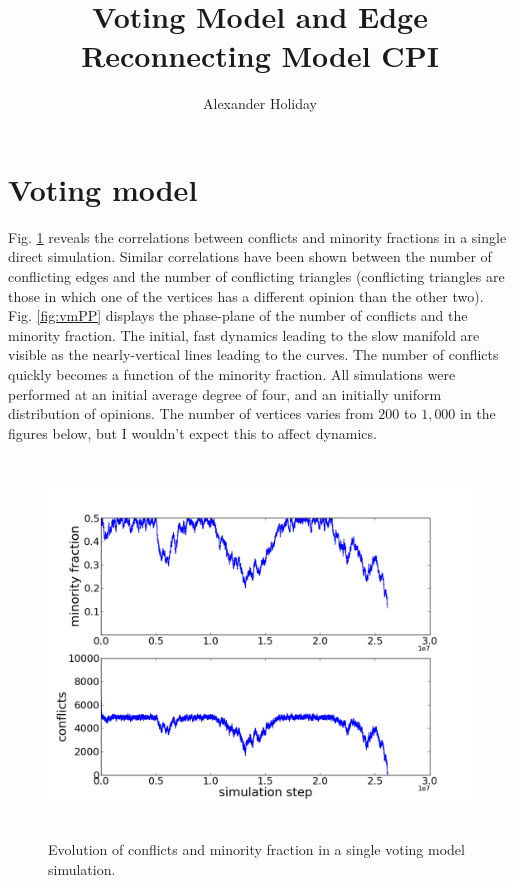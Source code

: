 \documentclass[11pt]{article}
\begin{document}
\title{\vspace{-5mm}Voting Model and Edge Reconnecting Model CPI}
\author{Alexander Holiday}
\maketitle
\section*{Voting model}

Fig. \ref{fig:vmDynamics} reveals the correlations between conflicts and minority fractions in a single direct simulation. Similar correlations have been shown between the number of conflicting edges and the number of conflicting triangles (conflicting triangles are those in which one of the vertices has a different opinion than the other two). Fig. \ref{fig:vmPP} displays the phase-plane of the number of conflicts and the minority fraction. The initial, fast dynamics leading to the slow manifold are visible as the nearly-vertical lines leading to the curves. The number of conflicts quickly becomes a function of the minority fraction. All simulations were performed at an initial average degree of four, and an initially uniform distribution of opinions. The number of vertices varies from $200$ to $1,000$ in the figures below, but I wouldn't expect this to affect dynamics.

\begin{figure}[h!]
  \centering
  \includegraphics[height=100mm]{vmDynamics}
  \caption{Evolution of conflicts and minority fraction in a single voting model simulation.}
  \label{fig:vmDynamics}
\end{figure}
\end{document}
